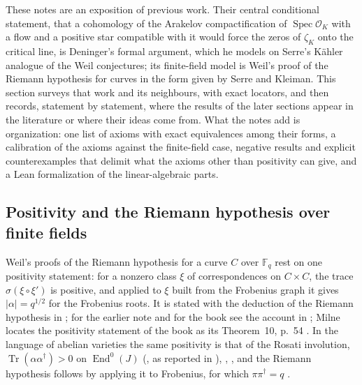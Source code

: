 \documentclass[11pt]{amsart}
\theoremstyle{plain}
\theoremstyle{definition}
\theoremstyle{remark}
\numberwithin{equation}{section}
\newcommand{\F}{\mathbb{F}}
\newcommand{\cO}{\mathcal{O}}
\DeclareMathOperator{\Tr}{Tr}
\DeclareMathOperator{\Spec}{Spec}
\begin{document}
These notes are an exposition of previous work. Their central
conditional statement, that a cohomology of the Arakelov
compactification of $\Spec\cO_K$ with a flow and a positive star
compatible with it would force the zeros of $\zeta_K$ onto the critical
line, is Deninger's formal argument, which he models on Serre's
K\"ahler analogue of the Weil conjectures; its finite-field model is
Weil's proof of the Riemann hypothesis for curves in the form given by
Serre and Kleiman. This section surveys that work and its neighbours,
with exact locators, and then records, statement by statement, where
the results of the later sections appear in the literature or where
their ideas come from. What the notes add is organization: one list of
axioms with exact equivalences among their forms, a calibration of the
axioms against the finite-field case, negative results and explicit
counterexamples that delimit what the axioms other than positivity can
give, and a Lean formalization of the linear-algebraic parts.

\subsection{Positivity and the Riemann hypothesis over finite
fields}\label{subsec:prior-ff}

Weil's proofs of the Riemann hypothesis for a curve $C$ over $\F_q$ rest
on one positivity statement: for a nonzero class $\xi$ of
correspondences on $C\times C$, the trace $\sigma(\xi\circ\xi')$ is
positive, and applied to $\xi$ built from the Frobenius graph it gives
$|\alpha|=q^{1/2}$ for the Frobenius roots. It is stated with the
deduction of the Riemann hypothesis in
\cite[p.~346 and p.~347]{Weil1941RHFunctionFields}; for the earlier
note \cite{Weil1940CRAS} and for the book \cite{Weil1948Courbes} see
the account in \cite[\S1]{Milne2016RHFF}; Milne locates the
positivity statement of the book as its Theorem~10, p.~54
\cite[p.~12]{Milne2016RHFF}. In the language of abelian varieties
the same positivity is that of the Rosati involution,
$\Tr(\alpha\alpha^\dagger)>0$ on $\operatorname{End}^0(J)$
(\cite{Weil1948VarietesAbeliennes}, as reported in
\cite[p.~23]{Milne2016RHFF}), \cite[\S21, Theorem~1, p.~192]%
{Mumford1974AV}, \cite[Theorem~14.3, p.~62]{MilneAV2008}, and the
Riemann hypothesis follows by applying it to Frobenius, for which
$\pi\pi^\dagger=q$ \cite[Theorems~1.27 and~1.30, pp.~21--22]%
{Milne2016RHFF}.
\end{document}
